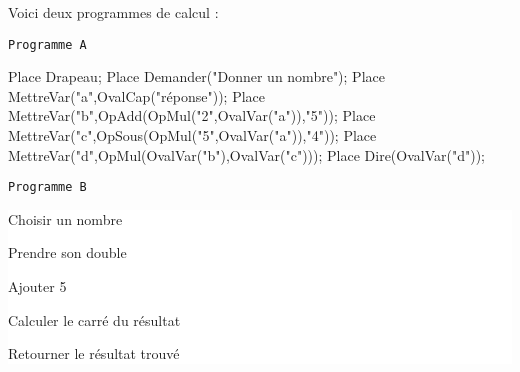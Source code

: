 Voici deux programmes de calcul : \par \smallskip
   \hskip18mm
   \begin{minipage}[t]{7.5cm}
      \hskip12mm \texttt{Programme A} \par \medskip
      \begin{Scratch}[Echelle=0.8]
         Place Drapeau;
         Place Demander("Donner un nombre");
         Place MettreVar("a",OvalCap("réponse"));
         Place MettreVar("b",OpAdd(OpMul("2",OvalVar("a")),"5"));
         Place MettreVar("c",OpSous(OpMul("5",OvalVar("a")),"4"));
         Place MettreVar("d",OpMul(OvalVar("b"),OvalVar("c")));
         Place Dire(OvalVar("d"));
      \end{Scratch}
   \end{minipage}
   \qquad
   \begin{minipage}[t]{6cm}
      \hskip8mm \texttt{Programme B} \par \medskip
      \colorbox{white}{\parbox{5cm}{Choisir un nombre \par
      Prendre son double \par
      Ajouter 5 \par
      Calculer le carré du résultat \par
      Retourner le résultat trouvé}}
   \end{minipage}
